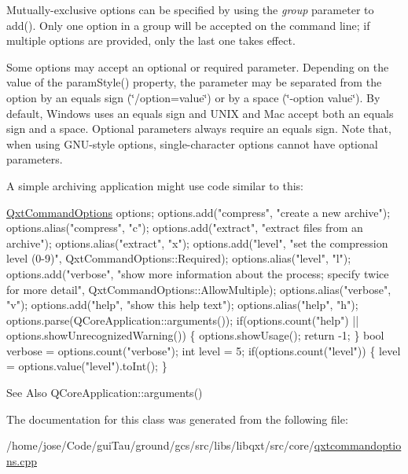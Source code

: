 Mutually-\/exclusive options can be specified by using the {\itshape group} parameter to add(). Only one option in a group will be accepted on the command line; if multiple options are provided, only the last one takes effect.

Some options may accept an optional or required parameter. Depending on the value of the param\-Style() property, the parameter may be separated from the option by an equals sign (\char`\"{}/option=value\char`\"{}) or by a space (\char`\"{}-\/option value\char`\"{}). By default, Windows uses an equals sign and U\-N\-I\-X and Mac accept both an equals sign and a space. Optional parameters always require an equals sign. Note that, when using G\-N\-U-\/style options, single-\/character options cannot have optional parameters.

A simple archiving application might use code similar to this\-: 
\begin{DoxyCode}
\hyperlink{class_qxt_command_options}{QxtCommandOptions} options;
options.add(\textcolor{stringliteral}{"compress"}, \textcolor{stringliteral}{"create a new archive"});
options.alias(\textcolor{stringliteral}{"compress"}, \textcolor{stringliteral}{"c"});
options.add(\textcolor{stringliteral}{"extract"}, \textcolor{stringliteral}{"extract files from an archive"});
options.alias(\textcolor{stringliteral}{"extract"}, \textcolor{stringliteral}{"x"});
options.add(\textcolor{stringliteral}{"level"}, \textcolor{stringliteral}{"set the compression level (0-9)"}, QxtCommandOptions::Required);
options.alias(\textcolor{stringliteral}{"level"}, \textcolor{stringliteral}{"l"});
options.add(\textcolor{stringliteral}{"verbose"}, \textcolor{stringliteral}{"show more information about the process; specify twice for more detail"}, 
      QxtCommandOptions::AllowMultiple);
options.alias(\textcolor{stringliteral}{"verbose"}, \textcolor{stringliteral}{"v"});
options.add(\textcolor{stringliteral}{"help"}, \textcolor{stringliteral}{"show this help text"});
options.alias(\textcolor{stringliteral}{"help"}, \textcolor{stringliteral}{"h"});
options.parse(QCoreApplication::arguments());
\textcolor{keywordflow}{if}(options.count(\textcolor{stringliteral}{"help"}) || options.showUnrecognizedWarning()) \{
    options.showUsage();
    \textcolor{keywordflow}{return} -1;
\}
\textcolor{keywordtype}{bool} verbose = options.count(\textcolor{stringliteral}{"verbose"});
\textcolor{keywordtype}{int} level = 5;
\textcolor{keywordflow}{if}(options.count(\textcolor{stringliteral}{"level"})) \{
    level = options.value(\textcolor{stringliteral}{"level"}).toInt();
\}
\end{DoxyCode}


\begin{DoxySeeAlso}{See Also}
Q\-Core\-Application\-::arguments() 
\end{DoxySeeAlso}


The documentation for this class was generated from the following file\-:\begin{DoxyCompactItemize}
\item 
/home/jose/\-Code/gui\-Tau/ground/gcs/src/libs/libqxt/src/core/\hyperlink{qxtcommandoptions_8cpp}{qxtcommandoptions.\-cpp}\end{DoxyCompactItemize}
